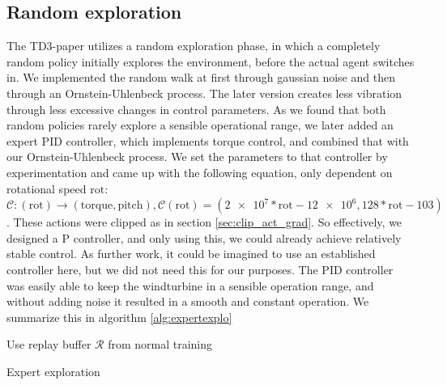 \documentclass[hyperref,german,beleg]{cgvpub}
\begin{document}
\subsection{Random exploration}

The TD3-paper \cite{fujimotoAddressingFunctionApproximation2018} utilizes a random exploration phase, in which a completely random policy \cite{mozerDiscoveringStructureReactive1990} initially explores the environment, before the actual agent switches in. We implemented the random walk at first through gaussian noise and then through an Ornstein-Uhlenbeck process. The later version creates less vibration through less excessive changes in control parameters. As we found that both random policies rarely explore a sensible operational range, we later added an expert PID controller, which implements torque control, and combined that with our Ornstein-Uhlenbeck process. We set the parameters to that controller by experimentation and came up with the following equation, only dependent on rotational speed $\mathrm{rot}$: $\mathcal{C}:(\mathrm{rot})\rightarrow(\mathrm{torque}, \mathrm{pitch}), \mathcal{C}(\mathrm{rot}) = (\num{2e7}*\mathrm{rot}-\num{12e6}, 128*\mathrm{rot}-103)$. These actions were clipped as in section \ref{sec:clip_act_grad}. So effectively, we designed a P controller, and only using this, we could already achieve relatively stable control. As further work, it could be imagined to use an established controller here, but we did not need this for our purposes. The PID controller was easily able to keep the windturbine in a sensible operation range, and without adding noise it resulted in a smooth and constant operation. We summarize this in algorithm \ref{alg:expertexplo}

\begin{algorithm}
\SetAlgoLined
Use replay buffer $\mathcal{R}$ from normal training\\

\caption{Expert exploration}
\label{alg:expertexplo}
\end{algorithm}
\end{document}

